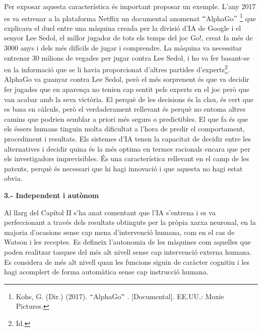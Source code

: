 \documentclass[12pt]{article}
\begin{document}
\vspace{\baselineskip}
Per exposar aquesta característica és important proposar un exemple. L’any 2017 es va estrenar a la plataforma Netflix un documental anomenat $``$AlphaGo$"$ \footnote{ Kohs, G. (Dir.) (2017). $``$AlphaGo$"$ . [Documental]. EE.UU.: Moxie Pictures.  } que explicava el duel entre una màquina creada per la divisió d’IA de Google i el senyor Lee Sedol, el millor jugador de tots els temps del joc Go!, creat fa més de 3000 anys i dels més difícils de jugar i comprendre. La màquina va necessitar entrenar 30 milions de vegades per jugar contra Lee Sedol, i ho va fer basant-se en la informació que se li havia proporcionat d’altres partides d’experts\footnote{ Id. }. AlphaGo va guanyar contra Lee Sedol, però el més sorprenent és que va decidir fer jugades que en aparença no tenien cap sentit pels experts en el joc però que van acabar amb la seva victòria. El perquè de les decisions és la clau, és cert que es basa en càlculs, però el verdaderament rellevant és perquè no entoma altres camins que podrien semblar a priori més segurs o predictibles. El que fa és que els éssers humans tinguin molta dificultat a l’hora de predir el comportament, procediment i resultats. Els sistemes d’IA tenen la capacitat de decidir entre les alternatives i decidir quina és la més optima en termes racionals encara que per els investigadors imprevisibles. És una característica rellevant en el camp de les patents, perquè és necessari que hi hagi innovació i que aquesta no hagi estat obvia.\par


\vspace{\baselineskip}
\textbf{3.- Independent i autònom }\par


\vspace{\baselineskip}
\begin{justify}
Al llarg del Capítol II s’ha anat comentant que l’IA s’entrena i es va perfeccionant a través dels resultats obtinguts per la pròpia xarxa neuronal, en la majoria d’ocasions sense cap mena d’intervenció humana, com en el cas de Watson i les receptes. Es defineix l’autonomia de les màquines com aquelles que poden realitzar tasques del més alt nivell sense cap intervenció externa humana. Es considera de més alt nivell quan les funcions siguin de caràcter cognitiu i les hagi acomplert de forma automàtica sense cap instrucció humana.
\end{justify}\par
\end{document}
